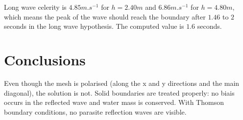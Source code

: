 Long wave celerity is $4.85 m.s^{-1}$ for $h = 2.40 m$ and $6.86 m.s^{-1}$ for $h = 4.80 m$,
which means the peak of the wave should reach the boundary after $1.46$ to $2$ seconds in the long wave hypothesis.
The computed value is $1.6$ seconds.

\section{ Conclusions}

Even though the mesh is polarised (along the x and y directions and the main
diagonal), the solution is not.
Solid boundaries are treated properly: no biais occurs in the reflected wave and
water mass is conserved.
With Thomson boundary conditions, no parasite reflection waves are visible.











